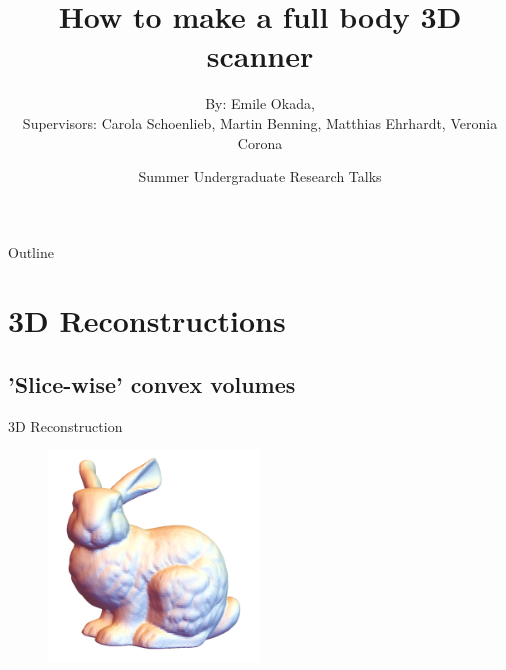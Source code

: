 \documentclass{beamer}
\title{How to make a full body 3D scanner}
\author{By: Emile Okada\inst{1}, \\ Supervisors: Carola Schoenlieb\inst{1}, Martin Benning\inst{1}, Matthias Ehrhardt\inst{1}, Veronia Corona\inst{1}}
\institute[University of Cambridge] %
{
  \inst{1}%
  DAMTP\\
  University of Cambridge
  }
\date{Summer Undergraduate Research Talks}
\begin{document}
\begin{frame}
  \titlepage
\end{frame}

\begin{frame}{Outline}
  \tableofcontents
\end{frame}

\section{3D Reconstructions}

\subsection{'Slice-wise' convex volumes}

\begin{frame}{3D Reconstruction}
    \begin{figure}[H]
      \centering
        \includegraphics[width=0.5\textwidth]{3D_rabit.png}
      \label{fig:f2}
    \end{figure}
\end{frame}
\end{document}
